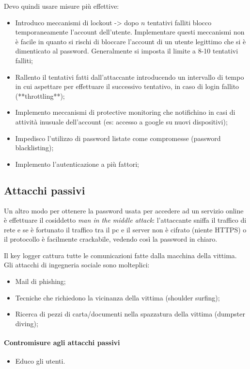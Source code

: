 \noindent Devo quindi usare misure più effettive:
\begin{itemize}
    \item Introduco meccanismi di lockout -> dopo $n$ tentativi falliti blocco temporaneamente l'account dell'utente. Implementare questi meccanismi non è facile in quanto si rischi di bloccare l'account di un utente legittimo che si è dimenticato al password. Generalmente si imposta il limite a 8-10 tentativi falliti;
    \item Rallento il tentativi fatti dall'attaccante introducendo un intervallo di tempo in cui aspettare per effettuare il successivo tentativo, in caso di login fallito (**throttling**);
    \item Implemento meccanismi di protective monitoring che notifichino in casi di attività inusuale dell'account (es: accesso a google su nuovi dispositivi);
    \item Impedisco l'utilizzo di password listate come compromesse (password blacklisting);
    \item Implemento l'autenticazione a più fattori;
\end{itemize}

\subsection{Attacchi passivi}
Un altro modo per ottenere la password usata per accedere ad un servizio online è effettuare il cosiddetto \textit{man in the middle attack}: l'attaccante sniffa il traffico di rete e se è fortunato il traffico tra il pc e il server non è cifrato (niente HTTPS) o il protocollo è facilmente crackabile, vedendo così la password in chiaro. 

Il key logger cattura tutte le comunicazioni fatte dalla macchina della vittima.
\\

\noindent Gli attacchi di ingegneria sociale sono molteplici:
\begin{itemize}
    \item Mail di phishing;
    \item Tecniche che richiedono la vicinanza della vittima (shoulder surfing);
    \item Ricerca di pezzi di carta/documenti nella spazzatura della vittima (dumpster diving);
\end{itemize}

\paragraph{Contromisure agli attacchi passivi}
\begin{itemize}
    \item Educo gli utenti.
\end{itemize}

